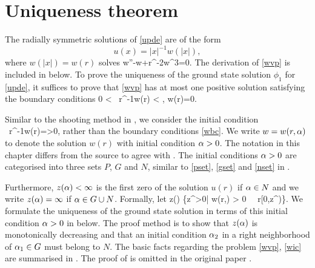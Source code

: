 \section{Uniqueness theorem}
The radially symmetric solutions of \eqref{upde} are of the form
$$u(x)=|x|^{-1}w(|x|),$$ 
where $w(|x|)=w(r)$ solves 
\be\label{wvp}
w''-w+r^{-2}w^3=0.
\ee
The derivation of \eqref{wvp} is included in  below.
%
To prove the uniqueness of the ground state solution $\phi_1$ for \eqref{upde},
it suffices to prove that \eqref{wvp} has at most one positive solution
satisfying the boundary conditions
\be\label{wbc}
0 < ~r^{-1}w(r) < \infty,\quad
{} w(r)=0.
\ee

Similar to the shooting method in , we consider the initial
condition 
\be\label{wic}
~r^{-1}w(r)=\a>0,
\ee
rather than the boundary conditions \eqref{wbc}. We write $w=w(r,\alpha)$ to denote
the solution $w(r)$ with initial condition $\alpha>0$. The notation in this chapter
differs from the source \cite{coffm} to agree with . The
initial conditions $\alpha>0$ are categorised into three sets $P$, $G$ and $N$,
similar to \eqref{pset}, \eqref{gset} and \eqref{nset} in .

Furthermore, $z(\alpha)<\infty$ is the first zero of the solution $u(r)$ if $\alpha\in N$
and we write $z(\alpha)=\infty$ if $\alpha\in G\cup N$.  Formally, let
\be\label{zdef} z(\a)\coloneqq \sup 
\left\{z^\ast>0\;\middle|\; w(r,\a) > 0~
~r\in [0,z^\ast)\right\}.\ee
We formulate the uniqueness of the ground state solution in terms of this
initial condition $\alpha>0$ in  below.  The proof method is to show
that $z(\alpha)$ is monotonically decreasing and that an initial condition $\alpha_2$ in a
right neighborhood of $\alpha_1\in G$ must belong to $N$.  The basic facts regarding
the problem \eqref{wvp}, \eqref{wic} are summarised in . The proof of
 is omitted in the original paper \cite{coffm}.

